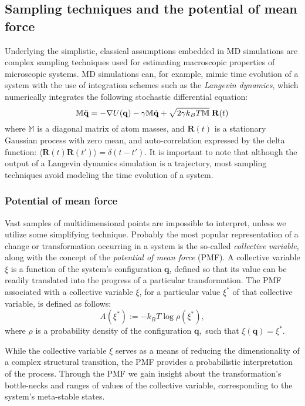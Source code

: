 \subsection{Sampling techniques and the potential of mean force}

Underlying the simplistic, classical assumptions embedded in MD simulations are complex sampling techniques used for estimating macroscopic properties of microscopic systems.
MD simulations can, for example, mimic time evolution of a system with the use of integration schemes such as the \emph{Langevin dynamics}, which numerically integrates the following stochastic differential equation:
$$
 \mathbb{M}\ddot{\mathbf{q}} = -\nabla U(\mathbf{q}) -\gamma \mathbb{M}\dot{\mathbf{q}} + \sqrt{2\gamma k_BT\mathbb{M}}\hspace{0.1cm}\mathbf{R}(t)
$$
where $\mathbb{M}$ is a diagonal matrix of atom masses, and $\mathbf{R}(t)$ is a stationary Gaussian process with zero mean, and auto-correlation expressed by the delta function: $\langle \mathbf{R}(t)\mathbf{R}(t') \rangle = \delta(t-t')$. 
It is important to note that although the output of a Langevin dynamics simulation is a trajectory, most sampling techniques avoid modeling the time evolution of a system.

\subsubsection{Potential of mean force}

Vast samples of multidimensional points are impossible to interpret, unless we utilize some simplifying technique.
Probably the most popular representation of a change or transformation occurring in a system is the so-called \emph{collective variable}, along with the concept of the \emph{potential of mean force} (PMF).
A collective variable $\xi$ is a function of the system's configuration $\mathbf{q}$, defined so that its value can be readily translated into the progress of a particular transformation.
The PMF associated with a collective variable $\xi$, for a particular value $\xi^*$ of that collective variable, is defined as follows: $$ A(\xi^*):=-k_BT\log \rho (\xi^*), $$ where $\rho$ is a probability density of the configuration $\mathbf{q},$ such that $\xi(\mathbf{q})=\xi^*$.

While the collective variable $\xi$ serves as a means of reducing the dimensionality of a complex structural transition, the PMF provides a probabilistic interpretation of the process.
Through the PMF we gain insight about the transformation's bottle-necks and ranges of values of the collective variable, corresponding to the system's meta-stable states.

